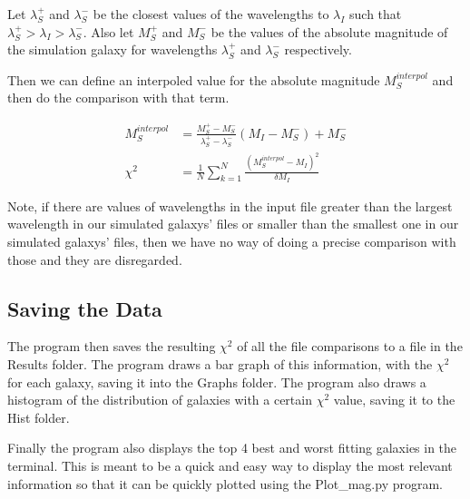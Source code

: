 \documentclass[11pt]{report}
\begin{document}
Let $\lambda_S^+$ and $\lambda_S^-$ be the closest values of the wavelengths to $\lambda_I$ such that $\lambda_S^+ > \lambda_I > \lambda_S^-$.  Also let $M_S^+$ and $M_S^-$ be the values of the absolute magnitude of the simulation galaxy for wavelengths $\lambda_S^+$ and $\lambda_S^-$ respectively.

Then we can define an interpoled value for the absolute magnitude $M_S^{interpol}$ and then do the comparison with that term.

\begin{align}
M_S^{interpol} &= \frac{M_S^+ - M_S^-}{\lambda_S^+ - \lambda_S^-} (M_I - M_S^-) + M_S^-\\
\chi^2 &= \frac{1}{N} \sum_{k=1}^N \frac{ (M_S^{interpol} - M_I)^2}{\delta M_I}
\end{align}

Note, if there are values of wavelengths in the input file greater than the largest wavelength in our simulated galaxys' files or smaller than the smallest one in our simulated galaxys' files, then we have no way of doing a precise comparison with those and they are disregarded.

\subsection{Saving the Data}

The program then saves the resulting $\chi^2$ of all the file comparisons to a file in the Results folder. The program draws a bar graph of this information, with the $\chi^2$ for each galaxy, saving it into the Graphs folder. The program also draws a histogram of the distribution of galaxies with a certain $\chi^2$ value, saving it to the Hist folder.

Finally the program also displays the top 4 best and worst fitting  galaxies in the terminal. This is meant to be a quick and easy way to display the most relevant information so that it can be quickly plotted using the Plot\_mag.py program.
\end{document}
